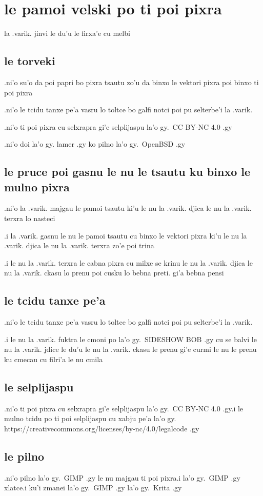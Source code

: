 \documentclass{report}
\begin{document}
\section{le pamoi velski po ti poi pixra}
la .varik. jinvi le du'u le firxa'e cu melbi
\subsection{le torveki}
.ni'o su'o da poi papri bo pixra tsautu zo'u da binxo le vektori pixra poi binxo ti poi pixra

.ni'o le tcidu tanxe pe'a vasru lo toltce bo galfi notci poi pu selterbe'i la .varik.

.ni'o ti poi pixra cu selxrapra gi'e selplijaspu la'o gy.\ CC BY-NC 4.0 .gy

.ni'o doi la'o gy. lamer .gy ko pilno la'o gy.\ OpenBSD .gy
\subsection{le pruce poi gasnu le nu le tsautu ku binxo le mulno pixra}
.ni'o la .varik. majgau le pamoi tsautu ki'u le nu la .varik. djica le nu la .varik. terxra lo nasteci

.i la .varik. gasnu le nu le pamoi tsautu cu binxo le vektori pixra ki'u le nu la .varik. djica le nu la .varik. terxra zo'e poi trina

.i le nu la .varik. terxra le cabna pixra cu milxe se krinu le nu la .varik. djica le nu la .varik. ckasu lo prenu poi cusku lo bebna preti. gi'a bebna pensi
\subsection{le tcidu tanxe pe'a}
.ni'o le tcidu tanxe pe'a vasru lo toltce bo galfi notci poi pu selterbe'i la .varik.

.i le nu la .varik. fuktra le cmoni po la'o gy.\ SIDESHOW BOB .gy cu se balvi le nu la .varik. jdice le du'u le nu la .varik. ckasu le prenu gi'e curmi le nu le prenu ku cmecau cu filri'a le nu cmila
\subsection{le selplijaspu}
.ni'o ti poi pixra cu selxrapra gi'e selplijaspu la'o gy.\ CC BY-NC 4.0 .gy\@ .i le mulno tcidu po ti poi selplijaspu cu xabju pe'a la'o gy. https://creativecommons.org/licenses/by-nc/4.0/legalcode .gy
\subsection{le pilno}
.ni'o pilno la'o gy.\ GIMP .gy le nu majgau ti poi pixra\@ .i  la'o gy.\ GIMP .gy xlatce\@ .i ku'i zmanei la'o gy.\ GIMP .gy la'o gy.\ Krita .gy
\end{document}
